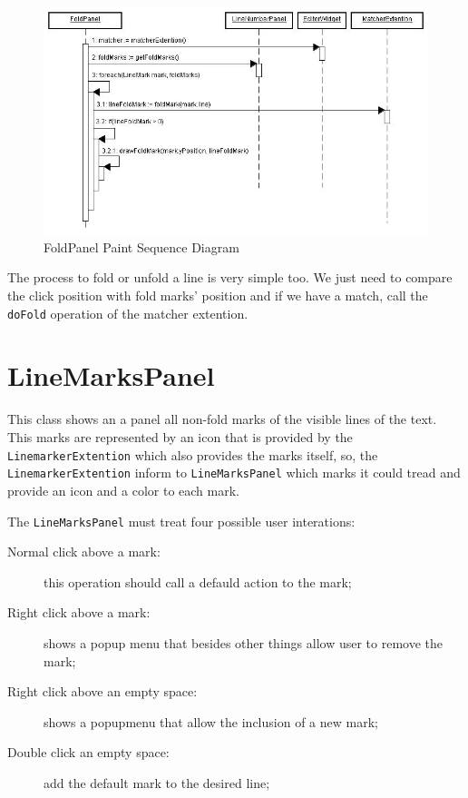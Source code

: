 \documentclass[11pt,a4paper]{report}
\begin{document}
\begin{figure}[hbt]
\centering
\includegraphics{images/foldpanelpaint.jpg}
\caption{FoldPanel Paint Sequence Diagram} \label{foldpanelpaint}
\end{figure}

The process to fold or unfold a line is very simple too. We just need to compare the click position with fold marks' position and if we have a match, call the \texttt{doFold} operation of the matcher extention.

\section{LineMarksPanel}
This class shows an a panel all non-fold marks of the visible lines of the text. This marks are represented by an icon that is provided by the \texttt{LinemarkerExtention} which also provides the marks itself, so, the \texttt{LinemarkerExtention} inform to \texttt{LineMarksPanel} which marks it could tread and provide an icon and a color to each mark.

The \texttt{LineMarksPanel} must treat four possible user interations:

\begin{description}
\item [Normal click above a mark:] this operation should call a defauld action to the mark;
\item [Right click above a mark:] shows a popup menu that besides other things allow user to remove the mark;
\item [Right click above an empty space:] shows a popupmenu that allow the inclusion of a new mark;
\item [Double click an empty space:] add the default mark to the desired line;
\end{description}
\end{document}
